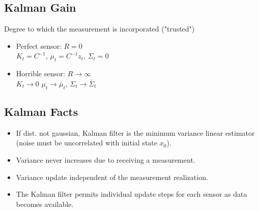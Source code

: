 \subsection*{Kalman Gain}
Degree to which the measurement is incorporated ("trusted")
\begin{itemize}
  \item Perfect sensor: $R = 0$\\
    $K_t = C^{-1}$, $\mu_t = C^{-1} z_t$, $\Sigma_t = 0$
  \item Horrible sensor: $R \to \infty$\\
    $K_t \to 0$ $\mu_t \to \bar{\mu}_t$, $\Sigma_t \to \bar{\Sigma}_t$
\end{itemize}

\subsection*{Kalman Facts}
\begin{itemize}
  \item If dist. not gaussian, Kalman filter is the minimum variance
    linear estimator (noise must be uncorrelated with initial state
    $x_0$).
  \item \alert{Variance never increases due to receiving a measurement}.
  \item \alert{Variance update independent of the measurement
    realization}.
  \item The Kalman filter permits individual update steps for each
    sensor as data becomes available.
\end{itemize}
